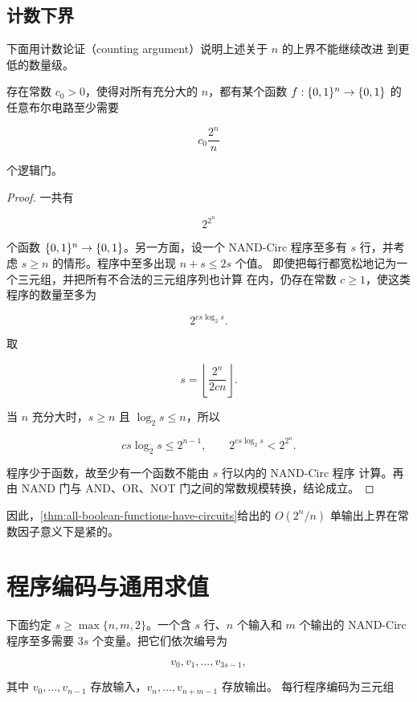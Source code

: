 \subsection{计数下界}

下面用计数论证（counting argument）说明上述关于 $n$ 的上界不能继续改进
到更低的数量级。

\begin{proposition}[布尔函数的电路下界]
  \label{prop:boolean-circuit-counting-lower-bound}
  存在常数 $c_0>0$，使得对所有充分大的 $n$，都有某个函数
  $f:\{0,1\}^n\to\{0,1\}$ 的任意布尔电路至少需要

  \[
    c_0\frac{2^n}{n}
  \]

  个逻辑门。
\end{proposition}

\begin{proof}
  一共有

  \[
    2^{2^n}
  \]

  个函数 $\{0,1\}^n\to\{0,1\}$。另一方面，设一个 NAND-Circ 程序至多有
  $s$ 行，并考虑 $s\geq n$ 的情形。程序中至多出现 $n+s\leq 2s$ 个值。
  即使把每行都宽松地记为一个三元组，并把所有不合法的三元组序列也计算
  在内，仍存在常数 $c\geq 1$，使这类程序的数量至多为

  \[
    2^{cs\log_2 s}.
  \]

  取

  \[
    s=\left\lfloor\frac{2^n}{2cn}\right\rfloor.
  \]

  当 $n$ 充分大时，$s\geq n$ 且 $\log_2s\leq n$，所以

  \[
    cs\log_2s\leq 2^{n-1},
    \qquad
    2^{cs\log_2s}<2^{2^n}.
  \]

  程序少于函数，故至少有一个函数不能由 $s$ 行以内的 NAND-Circ 程序
  计算。再由 NAND 门与 AND、OR、NOT 门之间的常数规模转换，结论成立。
\end{proof}

因此，\cref{thm:all-boolean-functions-have-circuits}给出的
$O(2^n/n)$ 单输出上界在常数因子意义下是紧的。

\section{程序编码与通用求值}

下面约定 $s\geq\max\{n,m,2\}$。一个含 $s$ 行、$n$ 个输入和 $m$ 个输出的
NAND-Circ 程序至多需要 $3s$ 个变量。把它们依次编号为

\[
  v_0,v_1,\ldots,v_{3s-1},
\]

其中 $v_0,\ldots,v_{n-1}$ 存放输入，$v_n,\ldots,v_{n+m-1}$ 存放输出。
每行程序编码为三元组

